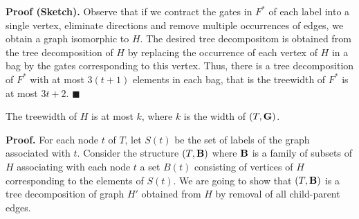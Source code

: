 \documentclass{llncs}
\begin{document}
{\bf Proof (Sketch).} Observe that if we contract the gates in $F^*$ of each label into a single vertex,
eliminate directions and remove multiple occurrences of edges, we obtain a graph isomorphic to $H$.
The desired tree decompositom is obtained from the tree decomposition of $H$ by replacing the occurrence of each vertex
of $H$ in a bag by the gates corresponding to this vertex. Thus, there is a tree decomposition of $F^*$
with at most $3(t+1)$ elements in each bag, that is the treewidth of $F^*$ is at most $3t+2$. $\blacksquare$

\begin{comment}
{\bf Proof.}
Let $H'$ be an undirected graph obtained from $F^*$ as follows.
For each label, replace all the associated gates by one vertex.
Vertices corresponding to different labels $S_1$ and $S_2$
are adjacent if and only there is a wire between a gate corresponding to
$S_1$ and a gate corresponding to $S_2$. It is not hard to see that
$H'$ is isomorphic to $H$. Indeed, consider a natural correspondence under 
which vertex $v \in V(H)$ is mapped into vertex $v' \in V(H')$ corresponding to the same
label. It follows that $u$ is adjacent to $v$ if and only if $u'$ is adjacent to $v'$.
Indeed, $u$ is adjacent to $v$ if and only if the new adjacency operation is applied 
on the corresponding labels or these labels are in a child-parent relation.
On the other hand $u'$ and $v'$ are adjacent if and only if there is a wire between
the gates of the corresponding labels. But the wire appears due to exactly the same 
reasons as the edge between $u$ and $v$. So, the isomorphism has been established.

It follows that $H$ has  tree decomposition of size $t$ or, that each bag of this 
decomposition consists of at most $t+1$ elements. In each bag replace each vertex 
of $H$ with the at most $3$ gates of $F^*$ corresponding to the same label. It is straightforward
to see that the resulting structure is a tree decomposition of $F^*$. It contains at most
$3t+3$ bags in each label and therefore the treewidth of $F^*$ is at most $3t+2$.
$\blacksquare$
\end{comment}

\begin{lemma} \label{widthh}
The treewidth of $H$ is at most $k$,
where $k$ is the width of $(T,{\bf G})$. 
\end{lemma}

{\bf Proof.}
For each node $t$ of $T$, let $S(t)$ be the set of labels of the graph
associated with $t$. Consider the structure $(T,{\bf B})$ where
${\bf B}$ is a family of subsets of $H$ associating with each node
$t$ a set $B(t)$ consisting of vertices of $H$ corresponding to the 
elements of $S(t)$. We are going to show that $(T,{\bf B})$ is a tree
decomposition of graph $H'$ obtained from $H$ by removal of all child-parent
edges.
\end{document}
